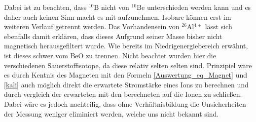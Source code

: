 Dabei ist zu beachten, dass $^{10}\text{B}$ nicht von $^{10}\text{Be}$ unterschieden werden kann und es daher auch keinen Sinn macht es mit aufzunehmen.
Isobare können erst im weiteren Verlauf getrennt werden.
Das Vorhandensein von $^{26}$Al$^{4+}$ lässt sich ebenfalls damit erklären, dass dieses Aufgrund seiner Masse bisher nicht magnetisch herausgefiltert wurde.
Wie bereits im Niedrigenergiebereich erwähnt, ist dieses schwer vom BeO zu trennen.
Nicht beachtet wurden hier die verschiedenen Sauerstoffisotope, da diese relativ selten selten sind.
Prinzipiel wäre es durch Kentnis des Magneten mit den Formeln \ref{Auswertung_eq_Magnet} und \ref{kali} auch möglich direkt die erwartete Stromstärke eines Ions zu berechnen und durch vergleich der erwarteten mit den berechneten auf die Ionen zu schließen.
Dabei wäre es jedoch nachteilig, dass ohne Verhältnisbildung die Unsicherheiten der Messung weniger eliminiert werden, welche uns nicht bekannt sind.

\clearpage

